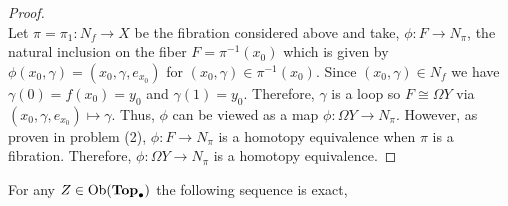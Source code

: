 \documentclass[12pt]{extarticle}
\begin{document}
\begin{proof}
\bigskip \\
Let $\pi = \pi_1 : N_f \to X$ be the fibration considered above and take, $\phi : F \to N_\pi$, the natural inclusion on the fiber $F = \pi^{-1}(x_0)$ which is given by $\phi(x_0, \gamma) = (x_0, \gamma, e_{x_0})$ for $(x_0, \gamma) \in \pi^{-1}(x_0)$. Since $(x_0, \gamma) \in N_f$ we have $\gamma(0) = f(x_0) = y_0$ and $\gamma(1) = y_0$. Therefore, $\gamma$ is a loop so $F \cong \Omega Y$ via $(x_0, \gamma, e_{x_0}) \mapsto \gamma$. Thus, $\phi$ can be viewed as a map $\phi : \Omega Y \to N_\pi$. However, as proven in problem (2), $\phi : F \to N_\pi$ is a homotopy equivalence when $\pi$ is a fibration. Therefore, $\phi : \Omega Y \to N_\pi$ is a homotopy equivalence. 
\end{proof}

\begin{theorem} \label{homexactpuppe}
For any $Z \in \mathrm{Ob}(\mathbf{Top}_{\bullet})$ the following sequence is exact,
\begin{center}
\end{center}  
\end{theorem}
\end{document}
